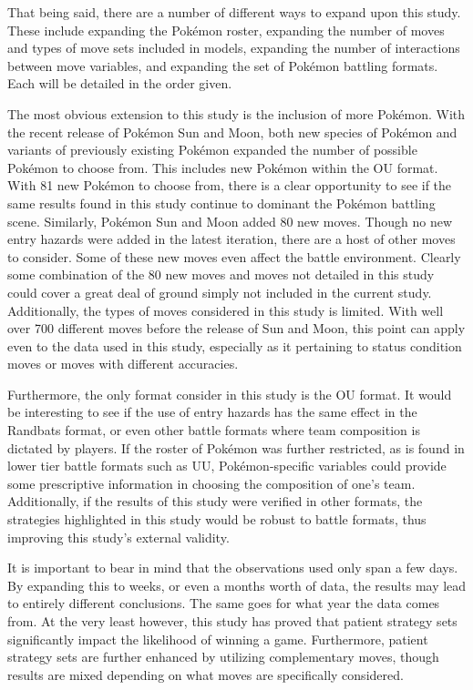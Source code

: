 \documentclass[12pt,twoside]{reedthesis}
\begin{document}
  That being said, there are a number of different ways to expand upon
  this study. These include expanding the Pokémon roster, expanding the
  number of moves and types of move sets included in models, expanding the
  number of interactions between move variables, and expanding the set of
  Pokémon battling formats. Each will be detailed in the order given.
  
  The most obvious extension to this study is the inclusion of more
  Pokémon. With the recent release of Pokémon Sun and Moon, both new
  species of Pokémon and variants of previously existing Pokémon expanded
  the number of possible Pokémon to choose from. This includes new Pokémon
  within the OU format. With 81 new Pokémon to choose from, there is a
  clear opportunity to see if the same results found in this study
  continue to dominant the Pokémon battling scene. Similarly, Pokémon Sun
  and Moon added 80 new moves. Though no new entry hazards were added in
  the latest iteration, there are a host of other moves to consider. Some
  of these new moves even affect the battle environment. Clearly some
  combination of the 80 new moves and moves not detailed in this study
  could cover a great deal of ground simply not included in the current
  study. Additionally, the types of moves considered in this study is
  limited. With well over 700 different moves before the release of Sun
  and Moon, this point can apply even to the data used in this study,
  especially as it pertaining to status condition moves or moves with
  different accuracies.
  
  Furthermore, the only format consider in this study is the OU format. It
  would be interesting to see if the use of entry hazards has the same
  effect in the Randbats format, or even other battle formats where team
  composition is dictated by players. If the roster of Pokémon was further
  restricted, as is found in lower tier battle formats such as UU,
  Pokémon-specific variables could provide some prescriptive information
  in choosing the composition of one's team. Additionally, if the results
  of this study were verified in other formats, the strategies highlighted
  in this study would be robust to battle formats, thus improving this
  study's external validity.
  
  It is important to bear in mind that the observations used only span a
  few days. By expanding this to weeks, or even a months worth of data,
  the results may lead to entirely different conclusions. The same goes
  for what year the data comes from. At the very least however, this study
  has proved that patient strategy sets significantly impact the
  likelihood of winning a game. Furthermore, patient strategy sets are
  further enhanced by utilizing complementary moves, though results are
  mixed depending on what moves are specifically considered.
  
\end{document}
